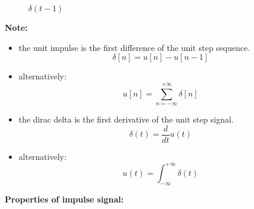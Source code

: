 \documentclass[a4paper,12pt]{book}
\begin{document}
\begin{figure}[h]  
\centering 
{}\hspace{6mm}
\caption{$\delta(t-1)$} \label{fig:M}  
\end{figure}
{\bf Note:}\\
\begin{itemize}
\item the unit impulse is the first difference of the unit step sequence.
$$\delta[n]=u[n]-u[n-1]$$
\item alternatively:
$$u[n]=\sum_{n=-\infty}^{+\infty}\delta[n]$$
\item the dirac delta is the first derivative of the unit step signal.
$$\delta(t)=\frac{d}{dt}u(t)$$
\item alternatively:
$$u(t)=\int_{-\infty}^{+\infty}\delta(t)$$
\end{itemize}
{\bf Properties of impulse signal:}\\
\end{document}
